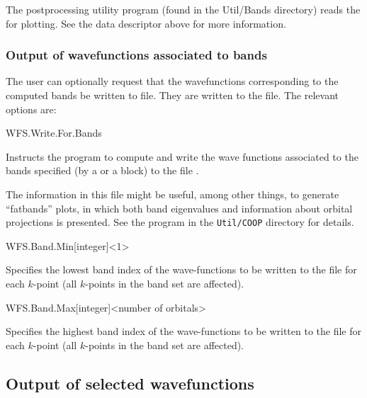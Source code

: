 \noindent
The  postprocessing
utility program (found in the Util/Bands directory) reads the
 for plotting.  See the  data
descriptor above for more information.


\subsubsection{Output of wavefunctions associated to bands}
\label{sec:wf-bands}

The user can optionally request that the wavefunctions corresponding
to the computed bands be written to file.  They are written to the
 file.
The relevant options are:

\begin{fdflogicalF}{WFS.Write.For.Bands}
  
  Instructs the program to compute and write the wave functions
  associated to the bands specified (by a  or a
   block) to the file .

  The information in this file might be useful, among other things, to
  generate ``fatbands'' plots, in which both band eigenvalues and
  information about orbital projections is presented.
   See the  program in the
  \texttt{Util/COOP} directory for details.

\end{fdflogicalF}

\begin{fdfentry}{WFS.Band.Min}[integer]<1>
  
  Specifies the lowest band index of the wave-functions to be written
  to the file  for each $k$-point (all $k$-points in the
  band set are affected).

\end{fdfentry}

\begin{fdfentry}{WFS.Band.Max}[integer]<number of orbitals>
  
  Specifies the highest band index of the wave-functions to be written
  to the file  for each $k$-point (all $k$-points in the
  band set are affected).

\end{fdfentry}

\subsection{Output of selected wavefunctions}
\label{sec:wf-output-user}

